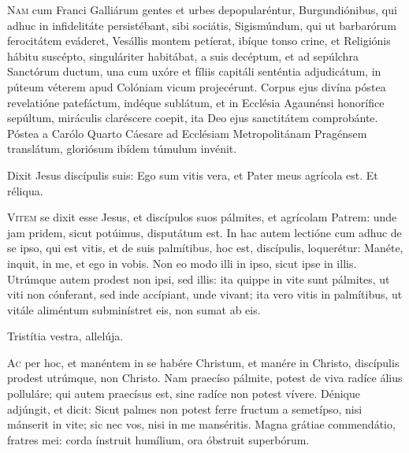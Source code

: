 
\lettrine{N}{am} cum Franci Galliárum gentes et urbes depopularéntur,
Burgundiónibus, qui adhuc in infidelitáte persistébant,
sibi sociátis, Sigismúndum, qui ut barbarórum ferocitátem eváderet,
Vesállis montem petíerat, ibíque tonso crine,
et Religiónis hábitu suscépto, singuláriter habitábat,
a suis decéptum, et ad sepúlchra Sanctórum ductum,
una cum uxóre et fíliis capitáli senténtia adjudicátum,
in púteum véterem apud Colóniam vicum projecérunt.
Corpus ejus divína póstea revelatióne patefáctum,
indéque sublátum, et in Ecclésia Agaunénsi honorífice sepúltum,
miráculis claréscere coepit, ita Deo ejus sanctitátem comprobánte.
Póstea a Carólo Quarto Cáesare
ad Ecclésiam Metropolitánam Pragénsem translátum,
gloriósum ibídem túmulum invénit.

\horaNocturnusIII



\inIlloTempore{}
Dixit Jesus discípulis suis:
Ego sum vitis vera, et Pater meus agrícola est.
Et réliqua.


\lettrine{V}{item} se dixit esse Jesus,
et discípulos suos pálmites,
et agrícolam Patrem:
unde jam pridem, sicut potúimus, disputátum est.
In hac autem lectióne cum adhuc de se ipso, qui est vitis,
et de suis palmítibus, hoc est, discípulis, loquerétur:
Manéte, inquit, in me, et ego in vobis.
Non eo modo illi in ipso, sicut ipse in illis.
Utrúmque autem prodest non ipsi, sed illis:
ita quippe in vite sunt pálmites,
ut viti non cónferant, sed inde accípiant, unde vivant;
ita vero vitis in palmítibus,
ut vitále aliméntum subminístret eis, non sumat ab eis.


\rr{} Tristítia vestra, allelúja.


\lettrine{A}{c} per hoc, et manéntem in se habére Christum,
et manére in Christo, discípulis prodest utrúmque, non Christo.
Nam praecíso pálmite, potest de viva radíce álius polluláre;
qui autem praecísus est, sine radíce non potest vívere.
Dénique adjúngit, et dicit:
Sicut palmes non potest ferre fructum a semetípso,
nisi mánserit in vite;
sic nec vos, nisi in me manséritis.
Magna grátiae commendátio, fratres mei:
corda ínstruit humílium, ora óbstruit superbórum.

